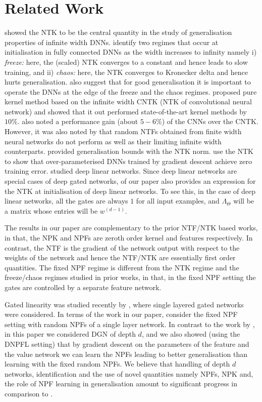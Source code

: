 
\section{Related Work}
\cite{ntk} showed the NTK to be the central quantity in the study of generalisation properties of infinite width DNNs. \cite{jacot2019freeze} identify two regimes that occur at initialisation in fully connected DNNs as the width increases to infinity namely i) \emph{freeze:} here, the (scaled) NTK converges to a constant and hence leads to slow training,  and  ii) \emph{chaos:} here, the NTK converges to Kronecker delta and hence hurts generalisation. \cite{jacot2019freeze} also suggest that for good generalisation it is important to operate the DNNs at the edge of the freeze and the chaos regimes. \cite{arora2019exact} proposed pure kernel method based on the infinite width CNTK (NTK of convolutional neural network) and showed that it out performed state-of-the-art kernel methods by $10\%$. \cite{arora2019exact} also noted a performance gain (about $5-6\%$) of the CNNs over the CNTK.  However, it was also noted by \cite{arora2019exact,lee2019wide} that random NTFs obtained from finite width neural networks do not perform as well as their limiting infinite width counterparts. 
\cite{arora,cao2019generalization} provided generalisation bounds with the NTK norm. \cite{dudnn} use the NTK to show that over-parameterised DNNs trained by gradient descent achieve zero training error. \cite{dudln,shamir,ganguli} studied deep linear networks. Since deep linear networks are special cases of deep gated networks,  of our paper also provides an expression for the NTK at initialisation of deep linear networks. To see this, in the case of deep linear networks, all the gates are always $1$ for all input examples, and $\Lambda_{\Theta}$ will be a matrix whose entries will be $w^{(d-1)}$.

The results in our paper are complementary to the prior NTF/NTK based works, in that, the NPK and NPFs are zeroth order kernel and features respectively. In contrast, the NTF is the gradient of the network output with respect to the weights of the network and hence the NTF/NTK are essentially first order quantities. The fixed NPF regime is different from the NTK regime and the freeze/chaos regimes studied in prior works, in that, in the fixed NPF setting the gates are controlled by a separate feature network.

Gated linearity was studied recently by \cite{sss}, where single layered gated networks were considered. In terms of the work in our paper, \cite{sss} consider the fixed NPF setting with random NPFs of a single layer network. In contrast to the work by \cite{sss}, in this paper we considered DGN of depth $d$, and we also showed (using the DNPFL setting) that by gradient descent on the parameters of the feature and the value network we can learn the NPFs leading to better generalisation than learning with the fixed random NPFs. We believe that handling of depth $d$ networks, identification and the use of novel quantities namely NPFs, NPK and, the role of NPF learning in generalisation amount to significant progress in comparison to \cite{sss}. 

